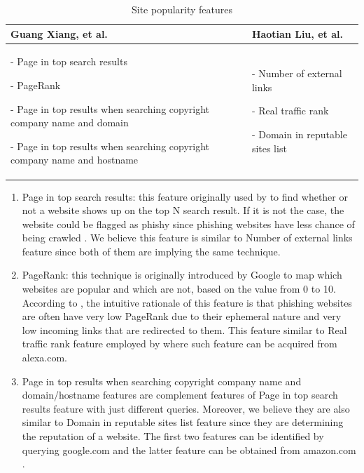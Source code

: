 \begin{table}
\begin{centering}
\begin{tabular}{>{\raggedright}p{5cm}>{\raggedright}p{3.5cm}}
\toprule 
\textbf{\footnotesize{}Guang Xiang, et al. \citep{xiang:2011}} & \textbf{\footnotesize{}Haotian Liu, et al. \citep{liu}}\tabularnewline
\midrule
\midrule 
{\scriptsize{}- Page in top search results }{\scriptsize \par}

{\scriptsize{}- PageRank}{\scriptsize \par}

{\scriptsize{}- Page in top results when searching copyright company
name and domain}{\scriptsize \par}

{\scriptsize{}- Page in top results when searching copyright company
name and hostname } & {\scriptsize{}- Number of external links}{\scriptsize \par}

{\scriptsize{}- Real traffic rank}{\scriptsize \par}

{\scriptsize{}- Domain in reputable sites list}\tabularnewline
\bottomrule
\end{tabular}\protect\caption{\label{tab:popular-features}Site popularity features \citep{xiang:2011,liu}}

\par\end{centering}

\end{table}

\begin{enumerate}
\item Page in top search results: this feature originally used by \citep{zhang:2007}
to find whether or not a website shows up on the top N search result.
If it is not the case, the website could be flagged as phishy since
phishing websites have less chance of being crawled \citep{xiang:2011}.
We believe this feature is similar to Number of external links feature
since both of them are implying the same technique.
\item PageRank: this technique is originally introduced by Google to map
which websites are popular and which are not, based on the value from
0 to 10. According to \citep{xiang:2011}, the intuitive rationale
of this feature is that phishing websites are often have very low
PageRank due to their ephemeral nature and very low incoming links
that are redirected to them. This feature similar to Real traffic
rank feature employed by \citep{liu} where such feature can be acquired
from alexa.com.
\item Page in top results when searching copyright company name and domain/hostname
features are complement features of Page in top search results feature
with just different queries. Moreover, we believe they are also similar
to Domain in reputable sites list feature since they are determining
the reputation of a website. The first two features can be identified
by querying google.com \citep{xiang:2011} and the latter feature
can be obtained from amazon.com \citep{liu}. 
\end{enumerate}

